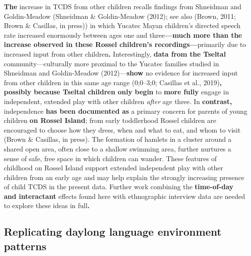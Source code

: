\documentclass[,man,floatsintext]{apa6}
\begin{document}
\textbf{The} increase in TCDS from other children recalls findings from
Shneidman and Goldin-Meadow (Shneidman \& Goldin-Meadow (2012); see also
(Brown, 2011; Brown \& Casillas, in press)) in which Yucatec Mayan
children's directed speech rate increased enormously between ages one
and three\textbf{---much more than the increase observed in these Rossel
children's recordings---}primarily due to increased input from other
children\textbf{.} Interestingly, \textbf{data from the Tseltal}
community---culturally more proximal to the Yucatec families studied in
Shneidman and Goldin-Meadow (2012)---\textbf{show} no evidence for
increased input from other children in this same age range (0;0--3;0;
Casillas et al., 2019)\textbf{, possibly because Tseltal children only
begin} to \textbf{more fully} engage in independent, extended play with
other children \emph{after} age three. In \textbf{contrast,}
independence \textbf{has been documented as} a primary concern for
parents of young children \textbf{on Rossel Island}; from early
toddlerhood Rossel children are encouraged to choose how they dress,
when and what to eat, and whom to visit (Brown \& Casillas, in press).
The formation of hamlets in a cluster around a shared open area, often
close to a shallow swimming area, further nurtures a sense of safe, free
space in which children can wander. These features of childhood on
Rossel Island support extended independent play with other children from
an early age and may help explain the strongly increasing presence of
child TCDS in the present data. Further work combining the
\textbf{time-of-day and interactant} effects found here with
ethnographic interview data are needed to explore these ideas in
full\textbf{.}

\subsection{\texorpdfstring{\textbf{Replicating daylong language
environment
patterns}}{Replicating daylong language environment patterns}}\label{replicating-daylong-language-environment-patterns}
\end{document}
